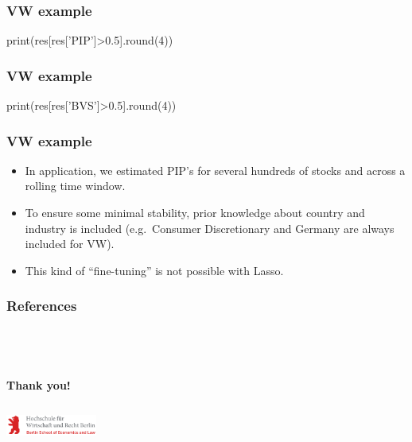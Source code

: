 \documentclass[xcolor=table,10pt]{beamer}
\begin{document}
\begin{frame}[fragile]
  \frametitle{VW example}
{\footnotesize%
\begin{pyconsole}[vw][frame=single]
print(res[res['PIP']>0.5].round(4))
\end{pyconsole}
}
\end{frame}

\begin{frame}[fragile]
  \frametitle{VW example}
{\footnotesize%
\begin{pyconsole}[vw][frame=single]
print(res[res['BVS']>0.5].round(4))
\end{pyconsole}
}
\end{frame}

\begin{frame}
  \frametitle{VW example}
  \begin{itemize}
  \item In application, we estimated PIP's for several hundreds of
    stocks and across a rolling time window.
  \item To ensure some minimal stability, prior knowledge about
    country and industry is included (e.g.\ Consumer
    Discretionary and Germany are always included for VW).
  \item This kind of ``fine-tuning'' is not possible with Lasso. 
  \end{itemize}
\end{frame}

\begin{frame}%
  \frametitle{References} 
    
\end{frame}


\section*{}
\begin{frame}
  \frametitle{$\left.\right.$}
  \begin{center}
    \vspace{1.5cm}
    \large{\bf Thank you!}
    \vspace{2.25cm}
  \end{center}
  \begin{columns}[b]
    \vspace{0pt} 
    \includegraphics[width=3cm]{HWR_Logo_RGB.jpg}
    \vspace{0pt}
  \end{columns}
\end{frame}
\end{document}
